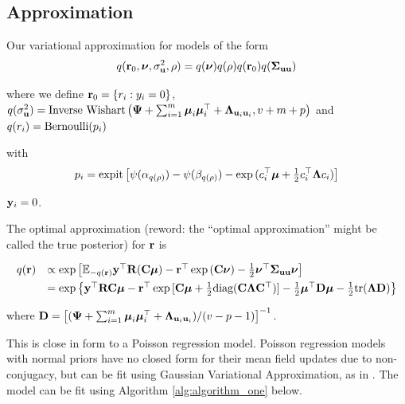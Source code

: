 \documentclass{article}[12pt]
\newcommand{\joc}[1]{{\color{red}#1}}
\begin{document}


\subsection{Approximation}

Our variational approximation for models of the form 
$$
q({\bf r}_0, {\boldsymbol \nu}, \sigma_{{\bf u}}^2, \rho) = q({\boldsymbol \nu})q(\rho) q({\bf r}_0)q({\boldsymbol \Sigma}_{{\bf u} {\bf u}})  \\
$$

\noindent 
where we define ${\bf r}_0 = \{ r_i : y_i = 0 \}$,
$q(\sigma_{{\bf u}}^2) = \mbox{Inverse Wishart}\left({\boldsymbol \Psi} + \sum_{i=1}^m {\boldsymbol \mu}_i {\boldsymbol \mu}_i^\top + {\boldsymbol \Lambda}_{{\bf u}_i {\bf u}_i}, v + m + 
p\right)$ \mbox{and } $q(r_i) = \text{Bernoulli} (p_i)$

\noindent 
with
$$
p_i = \text{expit} \left[ \psi{(\alpha_{q(\rho)})} - \psi{(\beta_{q(\rho)})} - \exp{(c_i^\top{\boldsymbol\mu}+  \tfrac{1}{2} c_i^\top {\boldsymbol\Lambda}c_i)} \right]
$$

\noindent 
{} ${\bf y}_i = 0$.


\noindent The optimal approximation \joc{(reword: the ``optimal approximation'' might be called the true posterior)} for ${\bf r}$ is


$$
\begin{array}{rl}
	q({\bf r}) & \propto \exp \left [ {\mathbb E}_{-q({\bf r})}{\bf y}^\top{\bf R}({\bf C}{\boldsymbol \mu}) - {\bf r}^\top\exp{({\bf C}{\boldsymbol\nu})}-\tfrac{1}{2} {\boldsymbol \nu}^\top {\boldsymbol\Sigma}_{{\bf u} {\bf u}} {\boldsymbol \nu} \right ]                                                  \\ [1ex]
	       & = \exp{ \left\{ {\bf y}^\top{\bf R}{\bf C}{\boldsymbol\mu}- {\bf r}^\top \exp{[{\bf C}{\boldsymbol\mu}+  \tfrac{1}{2} \text{diag}({\bf C}{\boldsymbol\Lambda}{\bf C}^\top)]} -  \tfrac{1}{2} {\boldsymbol\mu}^\top {\bf D}{\boldsymbol\mu}-  \tfrac{1}{2} \text{tr}({\boldsymbol\Lambda}{\bf D}) \right\} } 
\end{array}
$$

\noindent where ${\bf D} = \left[ ({\boldsymbol \Psi} + \sum_{i=1}^m {\boldsymbol \mu}_i {\boldsymbol \mu}_i^\top + {\boldsymbol \Lambda}_{{\bf u}_i{\bf u}_i}) / (v - p - 1) \right]^{-1}$. 

\noindent This is close in form to a Poisson regression model. Poisson regression models with normal priors
have no closed form for their mean field updates due to non- conjugacy, but can be fit using Gaussian
Variational Approximation, as in \cite{ormerod09}. The model can be fit using Algorithm
\ref{alg:algorithm_one} below.
\end{document}
